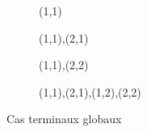 \begin{figure}[h!]
  \centering
  \begin{subfigure}[b]{0.16\textwidth}
    \resizebox{\linewidth}{!} {
       {{(1,1)}} {{}}
    }
  \end{subfigure}
  \begin{subfigure}[b]{0.20\textwidth}
    \resizebox{\linewidth}{!} {
       {{(1,1),(2,1)}} {{}}
    }
  \end{subfigure}
  \begin{subfigure}[b]{0.20\textwidth}
    \resizebox{\linewidth}{!} {
       {{(1,1),(2,2)}} {{}}
    }
  \end{subfigure}
  \begin{subfigure}[b]{0.20\textwidth}
    \resizebox{\linewidth}{!} {
       {{(1,1),(2,1),(1,2),(2,2)}} {{}}
    }
  \end{subfigure}
\caption{Cas terminaux globaux}
\label{fig:end_cases}
\end{figure}
